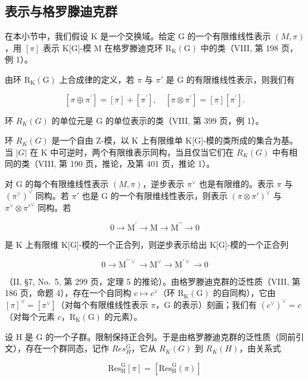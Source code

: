 \subsection{表示与格罗滕迪克群}

在本小节中，我们假设 K 是一个交换域。给定 G 的一个有限维线性表示 \((M,\pi)\)，用 \([\pi]\) 表示 K{[}G{]}-模 M 在格罗滕迪克环 \(\mathrm{R}_{\mathrm{K}}(\mathrm{G})\) 中的类（VIII, 第 198 页，例 1）。

由环 \(\mathrm{R}_{\mathrm{K}}(\mathrm{G})\) 上合成律的定义，若 \(\pi\) 与 \(\pi'\) 是 G 的有限维线性表示，则我们有

\[
[ \pi \oplus \pi^ {\prime} ] = [ \pi ] + [ \pi^ {\prime} ], \quad [ \pi \otimes \pi^ {\prime} ] = [ \pi ] [ \pi^ {\prime} ].
\]

环 \(R_{K}(G)\) 的单位元是 G 的单位表示的类（VIII, 第 399 页，例 1）。

环 \(R_{K}(G)\) 是一个自由 Z-模，以 K 上有限维单 K{[}G{]}-模的类所成的集合为基。当 \(|G|\) 在 K 中可逆时，两个有限维表示同构，当且仅当它们在 \(R_{K}(G)\) 中有相同的类（VIII, 第 190 页，推论，及第 401 页，推论 1）。

对 G 的每个有限维线性表示 \((M,\pi)\)，逆步表示 \(\pi^{\vee}\) 也是有限维的。表示 \(\pi\) 与 \((\pi^{\vee})^{\vee}\) 同构。若 \(\pi'\) 也是 G 的一个有限维线性表示，则表示 \((\pi\otimes\pi')^{\vee}\) 与 \(\pi^{\vee}\otimes\pi'^{\vee}\) 同构。若

\[
0 \longrightarrow \mathrm{M} ^ {\prime} \longrightarrow \mathrm{M} \longrightarrow \mathrm{M} ^ {\prime \prime} \longrightarrow 0
\]

是 K 上有限维 K{[}G{]}-模的一个正合列，则逆步表示给出 K{[}G{]}-模的一个正合列

\[
0 \longrightarrow \mathrm{M} ^ {\prime \prime \vee} \longrightarrow \mathrm{M} ^ {\vee} \longrightarrow \mathrm{M} ^ {\prime \vee} \longrightarrow 0
\]

（II, §7, No.~5, 第 299 页，定理 5 的推论）。由格罗滕迪克群的泛性质（VIII, 第 186 页，命题 4），存在一个自同构 \(c \mapsto c^{\vee}\)（环 \(\mathrm{R}_{\mathrm{K}}(\mathrm{G})\) 的自同构），它由 \([\pi]^{\vee} = [\pi^{\vee}]\)（对每个有限维线性表示 \(\pi\)，\(\mathrm{G}\) 的表示）刻画；我们有 \((c^{\vee})^{\vee} = c\)（对每个元素 \(c\)，\(\mathrm{R}_{\mathrm{K}}(\mathrm{G})\) 的元素）。

设 H 是 G 的一个子群。限制保持正合列。于是由格罗滕迪克群的泛性质（同前引文），存在一个群同态，记作 \(Res_{H}^{G}\)，它从 \(R_{K}(G)\) 到 \(R_{K}(H)\)，由关系式

\[
\mathrm{Res} _ {\mathrm{H}} ^ {\mathrm{G}} [ \pi ] = [ \mathrm{Res} _ {\mathrm{H}} ^ {\mathrm{G}} (\pi) ]\tag{6}
\]

